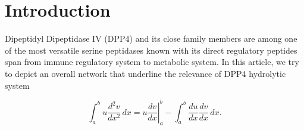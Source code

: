 \section{Introduction}
\label{intro} 

Dipeptidyl Dipeptidase IV (DPP4) and its close family members are among one of the most versatile serine peptidases known with its direct regulatory peptides span from immune regulatory system to metabolic system. In this article, we try to depict an overall network that underline the relevance of DPP4 hydrolytic system 

\begin{equation}
\label{eqn:drag}
	\int_a^bu\frac{d^2v}{dx^2}\,dx
	=\left.u\frac{dv}{dx}\right|_a^b
	-\int_a^b\frac{du}{dx}\frac{dv}{dx}\,dx.
\end{equation}
